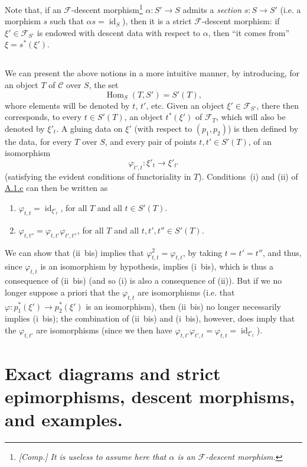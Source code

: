 \documentclass{article}
\renewcommand{\cal}[1]{{\mathcal{#1}}}
\DeclareMathOperator{\id}{id}
\DeclareMathOperator{\Hom}{Hom}
\newcommand{\oldpage}[1]{\marginpar{\footnotesize$\Big\vert$ \textit{p.~#1}}}
\begin{document}
Note that, if an $\cal{F}$-descent morphism\footnote{\emph{[Comp.] It is useless to assume here that $\alpha$ is an $\cal{F}$-descent morphism.}} $\alpha\colon S'\to S$ admits a \emph{section} $s\colon S\to S'$ (i.e. a morphism $s$ such that $\alpha s=\id_S$), then it is a strict $\cal{F}$-descent morphism:
if $\xi'\in\cal{F}_{S'}$ is endowed with descent data with respect to $\alpha$, then ``it comes from'' $\xi=s^*(\xi')$.


\subsection{}
\label{A.1.d}
We can present the above notions in a more intuitive manner, by introducing, for an object $T$ of $\cal{C}$ over $S$, the set
\[
  \Hom_S(T,S') = S'(T),
\]
whore elements will be denoted by $t$, $t'$, etc.
Given an object $\xi'\in\cal{F}_{S'}$, there then corresponds, to every $t\in S'(T)$, an object $t^*(\xi')$ of $\cal{F}_T$, which will also be denoted by $\xi'_t$.
A gluing data on $\xi'$ (with respect to $(p_1,p_2)$) is then defined by the data, for every $T$ over $S$, and every pair of points $t,t'\in S'(T)$, of an isomorphism
\[
  \varphi_{t',t}\colon \xi'_t \to \xi'_{t'}
\]
(satisfying the evident conditions of functoriality in $T$).
Conditions~(i) and (ii) of \hyperref[A.1.c]{A.1.c} can then be written as
\begin{enumerate}[(i {bis})]
  \item $\varphi_{t,t}=\id_{\xi'_t}$, for all $T$ and all $t\in S'(T)$.
\oldpage{190-06}
  \item $\varphi_{t,t''}=\varphi_{t,t'}\varphi_{t',t''}$, for all $T$ and all $t,t',t''\in S'(T)$.
\end{enumerate}

We can show that (ii~bis) implies that $\varphi_{t,t}^2=\varphi_{t,t}$, by taking $t=t'=t''$, and thus, since $\varphi_{t,t}$ is an isomorphism by hypothesis, implies (i~bis), which is thus a consequence of (ii~bis) (and so (i) is also a consequence of (ii)).
But if we no longer suppose a priori that the $\varphi_{t,t}$ are isomorphisms (i.e. that $\varphi\colon p_1^*(\xi')\to p_2^*(\xi')$ is an isomorphism), then (ii~bis) no longer necessarily implies (i~bis);
the combination of (ii~bis) and (i~bis), however, does imply that the $\varphi_{t,t'}$ are isomorphisms (since we then have $\varphi_{t,t'}\varphi_{t',t}=\varphi_{t,t}=\id_{\xi'_t}$).


\section{Exact diagrams and strict epimorphisms, descent morphisms, and examples.}
\label{A.2}
\end{document}
